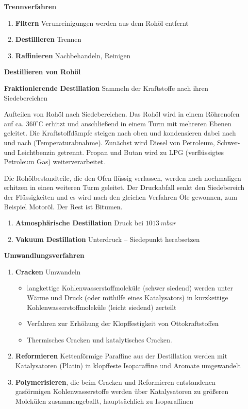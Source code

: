 \textbf{Trennverfahren}

\begin{enumerate}
\item
  \textbf{Filtern} Verunreinigungen werden aus dem Rohöl entfernt
\item
  \textbf{Destillieren} Trennen
\item
  \textbf{Raffinieren} Nachbehandeln, Reinigen
\end{enumerate}

\textbf{Destillieren von Rohöl}

\textbf{Fraktionierende Destillation} Sammeln der Kraftstoffe nach ihren
Siedebereichen

Aufteilen von Rohöl nach Siedebereichen. Das Rohöl wird in einem
Röhrenofen auf ca. $360^\circ\text{C}$ erhitzt und anschließend in
einem Turm mit mehreren Ebenen geleitet. Die Kraftstoffdämpfe steigen
nach oben und kondensieren dabei nach und nach (Temperaturabnahme).
Zunächst wird Diesel von Petroleum, Schwer- und Leichtbenzin getrennt.
Propan und Butan wird zu LPG (verflüssigtes Petroleum Gas)
weiterverarbeitet.

Die Rohölbestandteile, die den Ofen flüssig verlassen, werden nach
nochmaligen erhitzen in einen weiteren Turm geleitet. Der Druckabfall
senkt den Siedebereich der Flüssigkeiten und es wird nach den gleichen
Verfahren Öle gewonnen, zum Beispiel Motoröl. Der Rest ist Bitumen.

\begin{enumerate}
\item
  \textbf{Atmosphärische Destillation} Druck bei $1013~mbar$
\item
  \textbf{Vakuum Destillation} Unterdruck -- Siedepunkt herabsetzen
\end{enumerate}

\textbf{Umwandlungsverfahren}

\begin{enumerate}
\item
  \textbf{Cracken} Umwandeln

  \begin{itemize}
  \item
    langkettige Kohlenwasserstoffmoleküle (schwer siedend) werden unter
    Wärme und Druck (oder mithilfe eines Katalysators) in kurzkettige
    Kohlenwasserstoffmoleküle (leicht siedend) zerteilt
  \item
    Verfahren zur Erhöhung der Klopffestigkeit von Ottokraftstoffen
  \item
    Thermisches Cracken und katalytisches Cracken.
  \end{itemize}
\item
  \textbf{Reformieren} Kettenförmige Paraffine aus der Destillation
  werden mit Katalysatoren (Platin) in klopffeste Isoparaffine und
  Aromate umgewandelt
\item
  \textbf{Polymerisieren}, die beim Cracken und Reformieren entstandenen
  gasförmigen Kohlenwasserstoffe werden über Katalysatoren zu größeren
  Molekülen zusammengeballt, hauptsächlich zu Isoparaffinen
\end{enumerate}

